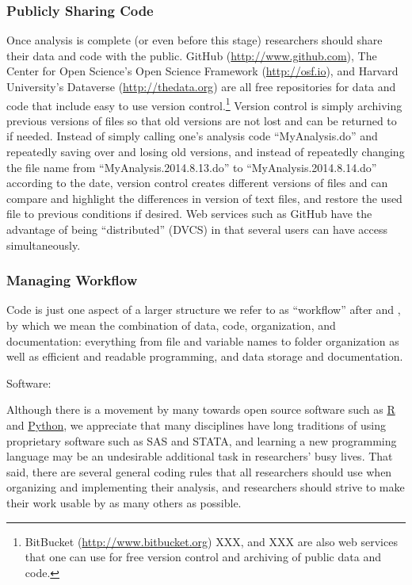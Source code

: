 \documentclass[12pt] {article}
\begin{document}
\subsubsection{Publicly Sharing Code}\label{publicly-sharing-code}

Once analysis is complete (or even before this stage) researchers should
share their data and code with the public. GitHub
(\url{http://www.github.com}), The Center for Open Science's Open
Science Framework (\url{http://osf.io}), and Harvard University's
Dataverse (\url{http://thedata.org}) are all free repositories for data
and code that include easy to use version control.\footnote{BitBucket
  (\href{styles.xml}{http://www.bitbucket.org}) XXX, and XXX are also
  web services that one can use for free version control and archiving
  of public data and code.} Version control is simply archiving previous
versions of files so that old versions are not lost and can be returned
to if needed. Instead of simply calling one's analysis code
``MyAnalysis.do'' and repeatedly saving over and losing old versions,
and instead of repeatedly changing the file name from
``MyAnalysis.2014.8.13.do'' to ``MyAnalysis.2014.8.14.do'' according to
the date, version control creates different versions of files and can
compare and highlight the differences in version of text files, and
restore the used file to previous conditions if desired. Web services
such as GitHub have the advantage of being ``distributed'' (DVCS) in
that several users can have access simultaneously.

\subsubsection{Managing Workflow}\label{managing-workflow}

Code is just one aspect of a larger structure we refer to as
``workflow'' after \cite{long_workflow_2008} and \cite{kirchkamp_workflow_????}, by which we mean the
combination of data, code, organization, and documentation: everything
from file and variable names to folder organization as well as efficient
and readable programming, and data storage and documentation.

Software:

Although there is a movement by many towards open source software such
as \href{http://www.r-project.org/}{R} and \href{https://www.python.org/}{Python}, we appreciate that many disciplines have long
traditions of using proprietary software such as SAS and STATA, and
learning a new programming language may be an undesirable additional
task in researchers' busy lives. That said, there are several general
coding rules that all researchers should use when organizing and
implementing their analysis, and researchers should strive to make their
work usable by as many others as possible.
\end{document}

